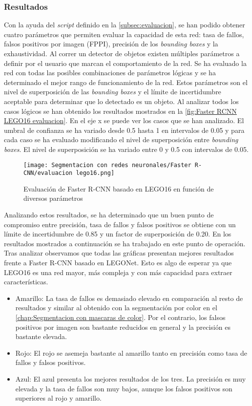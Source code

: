 \subsubsection*{Resultados}
Con la ayuda del \textit{script} definido en la \autoref{subsec:evaluacion}, se han podido obtener cuatro parámetros que permiten evaluar la capacidad de esta red: tasa de fallos, falsos positivos por imagen (FPPI), precisión de los \textit{bounding boxes} y la exhaustividad. Al correr un detector de objetos existen múltiples parámetros a definir por el usuario que marcan el comportamiento de la red. Se ha evaluado la red con todas las posibles combinaciones de parámetros lógicas y se ha determinado el mejor rango de funcionamiento de la red. Estos parámetros son el nivel de superposición de las \textit{bounding boxes} y el límite de incertidumbre aceptable para determinar que lo detectado es un objeto. Al analizar todos los casos lógicos se han obtenido los resultados mostrados en la \autoref{fig:Faster RCNN LEGO16 evaluacion}. En el eje x se puede ver los casos que se han analizado. El umbral de confianza se ha variado desde 0.5 hasta 1 en intervalos de 0.05 y para cada caso se ha evaluado modificando el nivel de superposición entre \textit{bounding boxes}. El nivel de superposición se ha variado entre 0 y 0.5 con intervalos de 0.05.

\begin{figure}[ht]  %
	\centering
	\texttt{[image: Segmentacion con redes neuronales/Faster R-CNN/evaluacion lego16.png]}
	\caption{Evaluación de Faster R-CNN basado en LEGO16 en función de diversos parámetros}
	\label{fig:Faster RCNN LEGO16 evaluacion}
\end{figure}

Analizando estos resultados, se ha determinado que un buen punto de compromiso entre precisión, tasa de fallos y falsos positivos se obtiene con un límite de incertidumbre de 0.85 y un factor de superposición de 0.20. En los resultados mostrados a continuación se ha trabajado en este punto de operación. Tras analizar observamos que todas las gráficas presentan mejores resultados frente a Faster R-CNN basado en LEGONet. Esto es algo de esperar ya que LEGO16 es una red mayor, más compleja y con más capacidad para extraer características.

\begin{itemize}
\item Amarillo: La tasa de fallos es demasiado elevado en comparación al resto de resultados y similar al obtenido con la segmentación por color en el \autoref{chap:Segmentacion con mascaras de color}. Por el contrario, los falsos positivos por imagen son bastante reducidos en general y la precisión es bastante elevada.
\item Rojo: El rojo se asemeja bastante al amarillo tanto en precisión como tasa de fallos y falsos positivos.
\item Azul: El azul presenta los mejores resultados de los tres. La precisión es muy elevada y la tasa de fallos son muy bajos, aunque los falsos positivos son superiores al rojo y amarillo.
\end{itemize}

